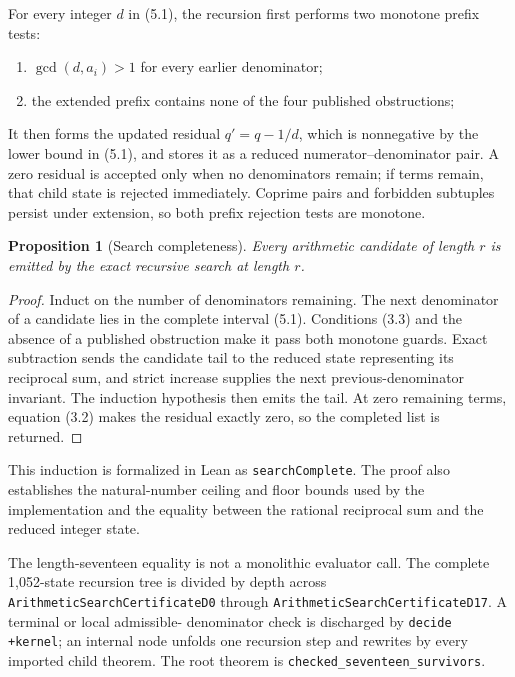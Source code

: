 \documentclass[11pt]{article}
\newtheorem{proposition}[theorem]{Proposition}
\theoremstyle{definition}
\newcommand{\leanname}[1]{\nolinkurl{#1}}
\begin{document}
For every integer $d$ in (5.1), the recursion first performs two monotone
prefix tests:
\begin{enumerate}[label=(\arabic*)]
\item $\gcd(d,a_i)>1$ for every earlier denominator;
\item the extended prefix contains none of the four published obstructions;
\end{enumerate}
It then forms the updated residual $q'=q-1/d$, which is nonnegative by the
lower bound in (5.1), and stores it as a reduced numerator--denominator pair.
A zero residual is accepted only when no denominators remain; if terms remain,
that child state is rejected immediately. Coprime pairs and forbidden
subtuples persist under extension, so both prefix rejection tests are
monotone.

\begin{proposition}[Search completeness]\label{prop:complete}
Every arithmetic candidate of length $r$ is emitted by the exact recursive
search at length $r$.
\end{proposition}

\begin{proof}
Induct on the number of denominators remaining. The next denominator of a
candidate lies in the complete interval (5.1). Conditions (3.3) and the
absence of a published obstruction make it pass both monotone guards. Exact
subtraction sends the candidate tail to the reduced state representing its
reciprocal sum, and strict increase supplies the next previous-denominator
invariant. The induction hypothesis then emits the tail. At zero remaining
terms, equation (3.2) makes the residual exactly zero, so the completed list
is returned.
\end{proof}

This induction is formalized in Lean as \leanname{searchComplete}. The proof
also establishes the natural-number ceiling and floor bounds used by the
implementation and the equality between the rational reciprocal sum and the
reduced integer state.

The length-seventeen equality is not a monolithic evaluator call. The complete
1,052-state recursion tree is divided by depth across
\leanname{ArithmeticSearchCertificateD0} through
\leanname{ArithmeticSearchCertificateD17}. A terminal or local admissible-
denominator check is discharged by \texttt{decide +kernel}; an internal node
unfolds one recursion step and rewrites by every imported child theorem. The
root theorem is \leanname{checked_seventeen_survivors}.
\end{document}
